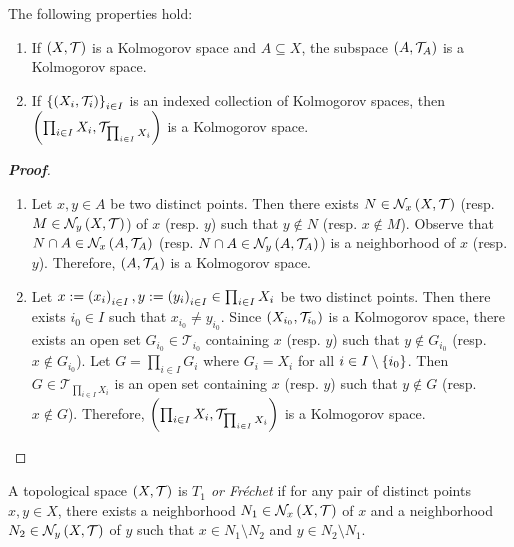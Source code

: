 \begin{proposition}
  The following properties hold:

  \begin{enumerate}
    \item If $\left(X,\mathcal{T}\right)$ is a Kolmogorov space and $A\subseteq X$, the subspace $\left(A,\mathcal{T}_A\right)$ is a Kolmogorov space.
    \item If $\left\{\left(X_i,\mathcal{T}_i\right)\right\}_{i\in I}$ is an indexed collection of Kolmogorov spaces, then $\left(\prod_{i\in I}{X_i},\mathcal{T}_{\prod_{i\in I}{X_i}}\right)$ is a Kolmogorov space.
  \end{enumerate}
  
  \begin{proof}[\rm\textbf{Proof}]
    \hfill
    \begin{enumerate}
      \item Let $x,y\in A$ be two distinct points. Then there exists $N\in\mathcal{N}_x\left(X,\mathcal{T}\right)$ (resp. $M\in\mathcal{N}_y\left(X,\mathcal{T}\right)$) of $x$ (resp. $y$) such that $y\notin N$ (resp. $x\notin M$). Observe that $N\cap A\in\mathcal{N}_x\left(A,\mathcal{T}_A\right)$ (resp. $N\cap A\in\mathcal{N}_y\left(A,\mathcal{T}_A\right)$) is a neighborhood of $x$ (resp. $y$). Therefore, $\left(A,\mathcal{T}_A\right)$ is a Kolmogorov space. 
      \item Let $x:=\left(x_i\right)_{i\in I},y:=\left(y_i\right)_{i\in I}\in\prod_{i\in I}{X_i}$ be two distinct points. Then there exists $i_0\in I$ such that $x_{i_0}\neq y_{i_0}$. Since $\left(X_{i_0},\mathcal{T}_{i_0}\right)$ is a Kolmogorov space, there exists an open set $G_{i_0}\in\mathcal{T}_{i_0}$ containing $x$ (resp. $y$) such that $y\notin G_{i_0}$ (resp. $x\notin G_{i_0}$). Let $G=\prod_{i\in I}{G_i}$ where $G_i=X_i$ for all $i\in I\setminus\left\{i_0\right\}$. Then $G\in\mathcal{T}_{\prod_{i\in I}{X_i}}$ is an open set containing $x$ (resp. $y$) such that $y\notin G$ (resp. $x\notin G$). Therefore, $\left(\prod_{i\in I}{X_i},\mathcal{T}_{\prod_{i\in I}{X_i}}\right)$ is a Kolmogorov space.
    \end{enumerate}
  \end{proof}
\end{proposition}

\begin{definition}
  A topological space $\left(X,\mathcal{T}\right)$ is \textit{$T_1$ or Fréchet} if for any pair of distinct points $x,y\in X$, there exists a neighborhood $N_1\in\mathcal{N}_x\left(X,\mathcal{T}\right)$ of $x$ and a neighborhood $N_2\in\mathcal{N}_y\left(X,\mathcal{T}\right)$ of $y$ such that $x\in N_1\setminus N_2$ and $y\in N_2\setminus N_1$.
\end{definition}

